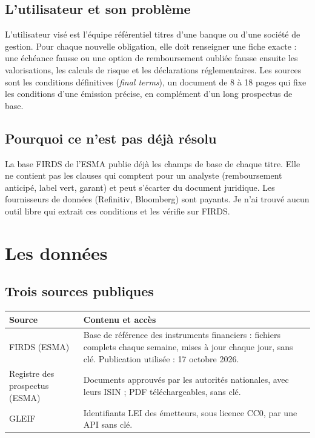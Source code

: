 \documentclass[11pt,a4paper]{article}
\begin{document}
\subsection{L'utilisateur et son problème}

L'utilisateur visé est l'équipe référentiel titres d'une banque ou d'une société de gestion. Pour chaque nouvelle obligation, elle doit renseigner une fiche exacte : une échéance fausse ou une option de remboursement oubliée fausse ensuite les valorisations, les calculs de risque et les déclarations réglementaires. Les sources sont les conditions définitives (\emph{final terms}), un document de 8 à 18 pages qui fixe les conditions d'une émission précise, en complément d'un long prospectus de base.

\subsection{Pourquoi ce n'est pas déjà résolu}

La base FIRDS de l'ESMA publie déjà les champs de base de chaque titre. Elle ne contient pas les clauses qui comptent pour un analyste (remboursement anticipé, label vert, garant) et peut s'écarter du document juridique. Les fournisseurs de données (Refinitiv, Bloomberg) sont payants. Je n'ai trouvé aucun outil libre qui extrait ces conditions et les vérifie sur FIRDS.

\section{Les données}

\subsection{Trois sources publiques}

\begin{table}[H]
\small
\begin{tabularx}{\linewidth}{lY}
\toprule
\textbf{Source} & \textbf{Contenu et accès} \\
\midrule
FIRDS (ESMA) & Base de référence des instruments financiers : fichiers complets chaque semaine, mises à jour chaque jour, sans clé. Publication utilisée : 17 octobre 2026. \\
Registre des prospectus (ESMA) & Documents approuvés par les autorités nationales, avec leurs ISIN ; PDF téléchargeables, sans clé. \\
GLEIF & Identifiants LEI des émetteurs, sous licence CC0, par une API sans clé. \\
\bottomrule
\end{tabularx}
\end{table}
\end{document}
